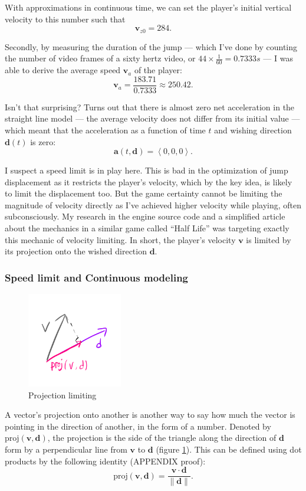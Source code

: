 \documentclass[a4paper,12pt]{article}
\newcommand{\tvec}[1]{\boldsymbol{#1}}
\newcommand{\tmag}[1]{\|#1\|}
\newcommand{\tang}[1]{\left\langle #1 \right\rangle}
\newcommand{\td}{\tvec{d}}
\newcommand{\ta}{\tvec{a}}
\newcommand{\tv}{\tvec{v}}
\begin{document}
With approximations in continuous time, we can set the player's initial vertical velocity to this number such that
\[
    \tv_{z0} = 284.
\]


Secondly, by measuring the duration of the jump --- which I've done by counting the number of video frames of a sixty hertz video, or $44 \times \frac{1}{60} = 0.7333 \si{s}$ --- I was able to derive the average speed $\tv_{a}$ of the player:
\[
    \tv_{a} = \frac{183.71}{0.7333} \approx 250.42.
\]

Isn't that surprising? Turns out that there is almost zero net acceleration in the straight line model --- the average velocity does not differ from its initial value --- which meant that the acceleration as a function of time $t$ and wishing direction $\td(t)$ is zero:
\[
    \ta(t, \td) = \tang{0, 0, 0}.
\]

I suspect a speed limit is in play here. This is bad in the optimization of jump displacement as it restricts the player's velocity, which by the key idea, is likely to limit the displacement too. But the game certainty cannot be limiting the magnitude of velocity directly as I've achieved higher velocity while playing, often subconsciously. My research in the engine source code \parencite{valvesoftware} and a simplified article about the mechanics in a similar game called ``Half Life'' \parencite{jwchong} was targeting exactly this mechanic of velocity limiting. In short, the player's velocity $\tv$ is limited by its projection onto the wished direction $\td$.

\subsubsection{Speed limit and Continuous modeling}
\begin{figure}
    \includegraphics[width=0.37\textwidth,right]{assets/2proj.png}
    \caption{Projection limiting}
    \label{fig:2proj}
\end{figure}
A vector's projection onto another is another way to say how much the vector is pointing in the direction of another, in the form of a number. Denoted by $\text{proj}(\tv, \td)$, the projection is the side of the triangle along the direction of $\td$ form by a perpendicular line from $\tv$ to $\td$ (figure \ref{fig:2proj}). This can be defined using dot products by the following identity (APPENDIX proof):
\[
    \text{proj}(\tv, \td) = \frac{\tv \cdot \td}{\tmag{\td}}.
\]
\end{document}
